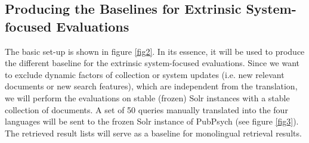 \documentclass[a4paper,11pt]{article}
\begin{document}
\begin{table}[h]
  \caption{Approaches for each solution and the evaluations.}
 \label{tab:approaches}
\end{table}

\subsection{Producing the Baselines for Extrinsic System-focused Evaluations}
\label{ss:baseline}
The basic set-up is shown in figure \ref{fig2}. In its essence, it will be used to produce the different baseline for the extrinsic system-focused evaluations. Since we want to exclude dynamic factors of collection or system updates (i.e. new relevant documents or new search features), which are independent from the translation, we will perform the evaluations on stable (frozen) Solr instances with a stable collection of documents. A set of 50 queries manually translated into the four languages will be sent to the frozen Solr instance of PubPsych (see figure \ref{fig3}). The retrieved result lists will serve as a baseline for monolingual retrieval results. 
\end{document}
